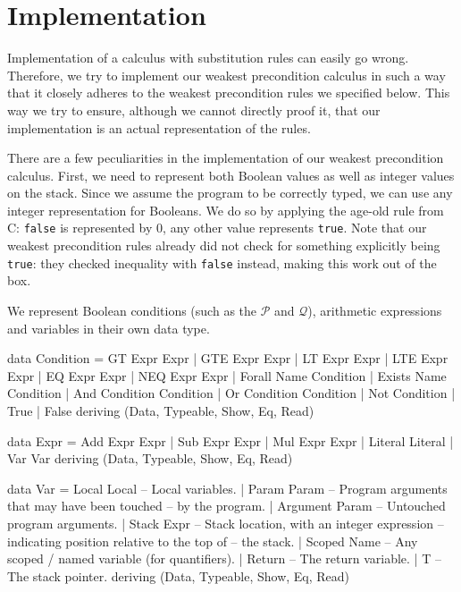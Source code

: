 \documentclass[a4paper]{article}
\newcommand{\Q}{\mathcal{Q}}
\renewcommand{\P}{\mathcal{P}}
\begin{document}
\begin{comment}
whileInst 0 _ = boundT 0 && (fromStack 0 `EQ` 0  `whileOp` with q [ Var T - 1 // T ])

whileInst n s = boundT 0 && (fromStack 0 `NEQ` 0 `whileOp` wp' (I.POP:s) (whileInst (n-1) s) post) `whileJunc` whileInst (n-1) s
\end{comment}

\section{Implementation}
Implementation of a calculus with substitution rules can easily go wrong. Therefore, we try to implement our weakest precondition calculus in such a way that it closely adheres to the weakest precondition rules we specified below. This way we try to ensure, although we cannot directly proof it, that our implementation is an actual representation of the rules.

There are a few peculiarities in the implementation of our weakest precondition calculus. First, we need to represent both Boolean values as well as integer values on the stack. Since we assume the program to be correctly typed, we can use any integer representation for Booleans. We do so by applying the age-old rule from C: \texttt{false} is represented by $0$, any other value represents \texttt{true}. Note that our weakest precondition rules already did not check for something explicitly being \texttt{true}: they checked inequality with \texttt{false} instead, making this work out of the box.

We represent Boolean conditions (such as the $\P$ and $\Q$), arithmetic expressions and variables in their own data type.
\begin{haskell}
data Condition = GT Expr Expr  | GTE Expr Expr | LT Expr Expr
               | LTE Expr Expr | EQ Expr Expr  | NEQ Expr Expr
               | Forall Name Condition   | Exists Name Condition
               | And Condition Condition | Or Condition Condition
               | Not Condition
               | True | False
  deriving (Data, Typeable, Show, Eq, Read)

data Expr = Add Expr Expr | Sub Expr Expr | Mul Expr Expr
          | Literal Literal
          | Var Var
  deriving (Data, Typeable, Show, Eq, Read)

data Var = Local Local    -- Local variables.
         | Param Param    -- Program arguments that may have been touched
                          -- by the program.
         | Argument Param -- Untouched program arguments.
         | Stack Expr     -- Stack location, with an integer expression
                          -- indicating position relative to the top of
                          -- the stack.
         | Scoped Name    -- Any scoped / named variable (for quantifiers).
         | Return         -- The return variable.
         | T              -- The stack pointer.
  deriving (Data, Typeable, Show, Eq, Read)
\end{haskell}
\end{document}
